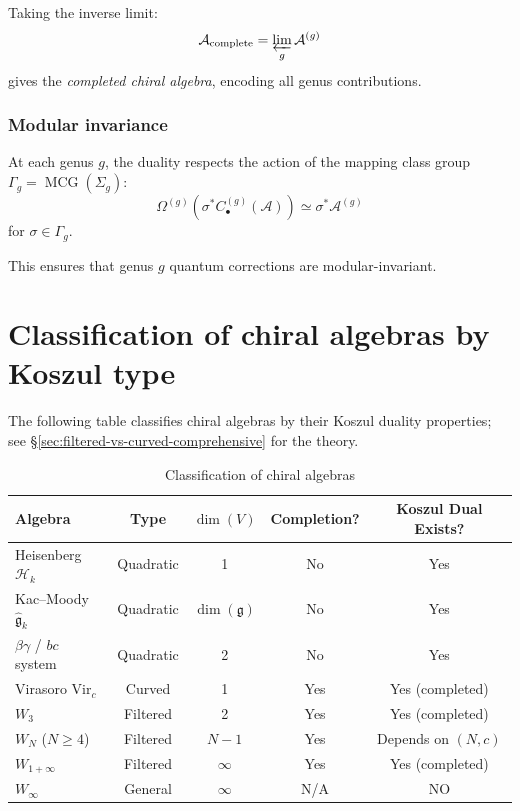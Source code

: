 Taking the inverse limit:
\[\mathcal{A}_{\text{complete}} = \varprojlim_g \mathcal{A}^{(g)}\]
gives the \emph{completed chiral algebra}, encoding all genus contributions.

\subsubsection{Modular invariance}

At each genus $g$, the duality respects the action of the mapping class group $\Gamma_g = \operatorname{MCG}(\Sigma_g)$:
\[\Omega^{(g)}(\sigma^* C_{\bullet}^{(g)}(\mathcal{A})) \simeq \sigma^* \mathcal{A}^{(g)}\]
for $\sigma \in \Gamma_g$.

This ensures that genus $g$ quantum corrections are modular-invariant.


\section{Classification of chiral algebras by Koszul type}
\label{app:koszul-classification}

The following table classifies chiral algebras by their Koszul duality
properties; see \S\ref{sec:filtered-vs-curved-comprehensive} for the theory.

\begin{table}[H]
\centering
\caption{Classification of chiral algebras}
\begin{tabular}{|l|c|c|c|c|}
\hline
\textbf{Algebra} & \textbf{Type} & \textbf{$\dim(V)$} & \textbf{Completion?} & \textbf{Koszul Dual Exists?} \\
\hline
\hline
Heisenberg $\mathcal{H}_k$ & Quadratic & 1 & No & Yes \\
\hline
Kac--Moody $\widehat{\mathfrak{g}}_k$ & Quadratic & $\dim(\mathfrak{g})$ & No & Yes \\
\hline
$\beta\gamma$ / $bc$ system & Quadratic & 2 & No & Yes \\
\hline
Virasoro $\text{Vir}_c$ & Curved & 1 & Yes & Yes (completed) \\
\hline
$W_3$ & Filtered & 2 & Yes & Yes (completed) \\
\hline
$W_N$ ($N \geq 4$) & Filtered & $N-1$ & Yes & Depends on $(N, c)$ \\
\hline
$W_{1+\infty}$ & Filtered & $\infty$ & Yes & Yes (completed) \\
\hline
$W_\infty$ & General & $\infty$ & N/A & NO \\
\hline
\end{tabular}
\end{table}

